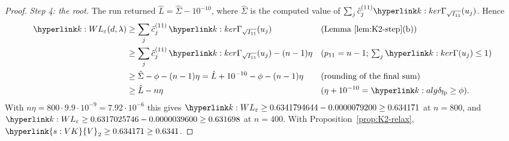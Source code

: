 \documentclass[11pt]{article}
\DeclareRobustCommand{\sy}[2]{{\hyperlink{#1}{#2}}}
\newcommand{\1}{\mathbf{1}}
\newcommand{\VK}{\sy{s:VK}{V}}
\begin{document}
\begin{proof}
\textit{Step 4: the root.} The run returned $\hat L=\hat\Sigma-10^{-10}$, where $\hat\Sigma$ is the computed value of $\sum_j\hat c^{(11)}_j\kGam_{\sqrt{I_{11}}}(u_j)$.
Hence
\begin{align*}
\kL(d,\lambda)
&\ge\sum_j\tilde c^{(11)}_j\,\kGam_{\sqrt{I_{11}}}(u_j) && \text{(Lemma~\ref{lem:K2-step}(b))}\\
&\ge\sum_j\hat c^{(11)}_j\,\kGam_{\sqrt{I_{11}}}(u_j)-(n-1)\eta && \text{($p_{11}=n-1$; $\textstyle\sum_j\kGam(u_j)\le1$)}\\
&\ge\hat\Sigma-\phi-(n-1)\eta=\hat L+10^{-10}-\phi-(n-1)\eta && \text{(rounding of the final sum)}\\
&\ge\hat L-n\eta && \text{($\eta+10^{-10}=\kdfp\ge\phi$)}.
\end{align*}
With $n\eta=800\cdot9.9\cdot10^{-9}=7.92\cdot10^{-6}$ this gives $\kL\ge0.6341794644-0.0000079200\ge0.634171$ at $n=800$, and $\kL\ge0.6317025746-0.0000039600\ge0.631698$ at
$n=400$. With Proposition~\ref{prop:K2-relax}, $\VK_2\ge0.634171\ge0.6341$.
\end{proof}
\end{document}

